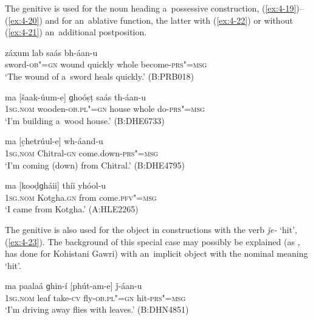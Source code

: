 The genitive is used for the noun heading a~possessive construction, (\ref{ex:4-19})--(\ref{ex:4-20}) and for an~ablative function, the latter with (\ref{ex:4-22}) or without (\ref{ex:4-21}) an~additional postposition.


\begin{exe}
\ex
\label{ex:4-19}
\gll [khanɡar-íi-e] záxum lab saás bh-áan-u \\
	sword-\textsc{ob"=gn} wound quickly whole become-\textsc{prs"=msg} \\
\glt `The wound of a~sword heals quickly.' (B:PRB018)
\end{exe}

\begin{exe}
\ex
\label{ex:4-20}
\gll ma [šaak-úum-e] ɡhoóṣṭ saás th-áan-u \\
	\textsc{1sg.nom} wooden-\textsc{ob.pl"=gn} house whole do-\textsc{prs"=msg} \\
\glt `I'm building a~wood house.' (B:DHE6733)
\end{exe}

\begin{exe}
\ex
\label{ex:4-21}
\gll ma [c̣hetrúul-e] wh-áand-u \\
	\textsc{1sg.nom} Chitral-\textsc{gn} come.down-\textsc{prs"=msg} \\
\glt `I'm coming (down) from Chitral.' (B:DHE4795)
\end{exe}

\begin{exe}
\ex
\label{ex:4-22}
\gll ma [kooḍɡháii] thíi yhóol-u \\
	\textsc{1sg.nom} Kotgha.\textsc{gn} from come.\textsc{pfv"=msg} \\
\glt `I came from Kotgha.' (A:HLE2265)
\end{exe}

The genitive is also used for the object in constructions with the verb \textit{ǰe-} `hit', (\ref{ex:4-23}). The background of this special case may possibly be explained (as \citealt[43]{baart1999a}, has done for Kohistani Gawri) with an~implicit object with the nominal meaning `hit'.

\begin{exe}
\ex
\label{ex:4-23}
\gll ma paalaá ɡhin-í [phút-am-e] ǰ-áan-u \\
	\textsc{1sg.nom} leaf take-\textsc{cv} fly-\textsc{ob.pl"=gn} hit-\textsc{prs"=msg} \\
\glt `I'm driving away flies with leaves.' (B:DHN4851)
\end{exe}

